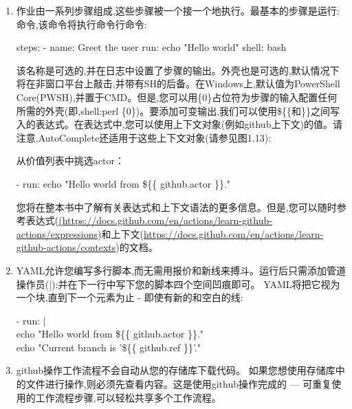 \begin{enumerate}
\item 
作业由一系列步骤组成,这些步骤被一个接一个地执行。最基本的步骤是运行:命令,该命令将执行命令行命令:

\begin{shell}
steps:
  - name: Greet the user
    run: echo "Hello world"
    shell: bash
\end{shell}

该名称是可选的,并在日志中设置了步骤的输出。外壳也是可选的,默认情况下将在非窗口平台上敲击,并带有SH的后备。在Windows上,默认值为PowerShell Core(PWSH),并置于CMD。但是,您可以用\{0\}占位符为步骤的输入配置任何所需的外壳(即,shell:perl \{0\})。要添加可变输出,我们可以使用\$\{\{和\}\}之间写入的表达式。在表达式中,您可以使用上下文对象(例如github上下文)的值。请注意,AutoComplete还适用于这些上下文对象(请参见图1.13):


从价值列表中挑选actor：

\begin{tcolorbox}[ breakable,colback = bashcodebg, colframe= black!50!white]
\scriptsize{
- run: echo "Hello world  from \$\{\{ github.actor \}\}."
}
\end{tcolorbox}

您将在整本书中了解有关表达式和上下文语法的更多信息。但是,您可以随时参考表达式(\url{(https://docs.github.com/en/actions/learn-github-actions/expressions})和上下文(\url{https://docs.github.com/en/actions/learn-github-actions/contexts})的文档。

\item 
YAML允许您编写多行脚本,而无需用报价和新线来搏斗。运行后只需添加管道操作员(|):并在下一行中写下您的脚本四个空间凹痕即可。 YAML将把它视为一个块,直到下一个元素为止 - 即使有新的和空白的线:

\begin{tcolorbox}[ breakable,colback = bashcodebg, colframe= black!50!white]
\scriptsize{
- run: | \\
\hspace*{2em}echo "Hello world  from \$\{\{ github.actor \}\}." \\
\hspace*{2em}echo "Current branch is '\$\{\{ github.ref \}\}'."
}
\end{tcolorbox}

\item 
github操作工作流程不会自动从您的存储库下载代码。 如果您想使用存储库中的文件进行操作,则必须先查看内容。这是使用github操作完成的 --- 可重复使用的工作流程步骤,可以轻松共享多个工作流程。


\end{enumerate}
